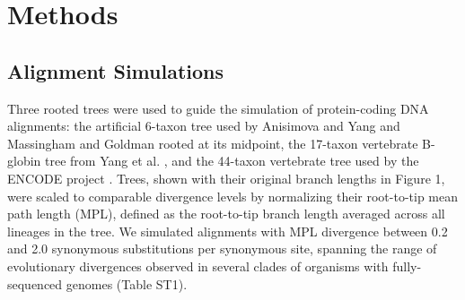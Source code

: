 \documentclass{mbe}
\begin{document}
\section*{Methods}

\subsection*{Alignment Simulations}

Three rooted trees were used to guide the simulation of protein-coding
DNA alignments: the artificial 6-taxon tree used by Anisimova and Yang
\citeyearpar{Anisimova2001Accuracy} and Massingham and Goldman
\citeyearpar{Massingham2005Detecting} rooted at its midpoint, the
17-taxon vertebrate B-globin tree from Yang et
al. \citeyearpar{Yang2000CodonSubstitution}, and the 44-taxon
vertebrate tree used by the ENCODE project
\citep{2007Identification,Nikolaev2007Early}. Trees, shown with their
original branch lengths in Figure 1, were scaled to comparable
divergence levels by normalizing their root-to-tip mean path length
(MPL), defined as the root-to-tip branch length averaged across all
lineages in the tree. We simulated alignments with MPL divergence
between 0.2 and 2.0 synonymous substitutions per synonymous site,
spanning the range of evolutionary divergences observed in several
clades of organisms with fully-sequenced genomes (Table ST1).
\end{document}

